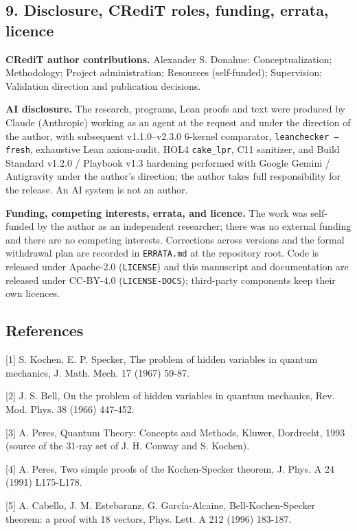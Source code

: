 \documentclass[11pt,a4paper]{article}
\begin{document}
\subsection{9. Disclosure, CRediT roles, funding, errata, licence}\label{9-disclosure-funding-licence}

\textbf{CRediT author contributions.} Alexander S. Donahue: Conceptualization; Methodology; Project administration; Resources (self-funded); Supervision; Validation direction and publication decisions.

\textbf{AI disclosure.} The research, programs, Lean proofs and text were produced by Claude (Anthropic) working as an agent at the request and under the direction of the author, with subsequent v1.1.0--v2.3.0 6-kernel comparator, \texttt{leanchecker --fresh}, exhaustive Lean axiom-audit, HOL4 \texttt{cake\_lpr}, C11 sanitizer, and Build Standard v1.2.0 / Playbook v1.3 hardening performed with Google Gemini / Antigravity under the author's direction; the author takes full responsibility for the release. An AI system is not an author.

\textbf{Funding, competing interests, errata, and licence.} The work was self-funded by the author as an independent researcher; there was no external funding and there are no competing interests. Corrections across versions and the formal withdrawal plan are recorded in \texttt{ERRATA.md} at the repository root. Code is released under Apache-2.0 (\texttt{LICENSE}) and this manuscript and documentation are released under CC-BY-4.0 (\texttt{LICENSE-DOCS}); third-party components keep their own licences.

\subsection{References}\label{references}

{[}1{]} S. Kochen, E. P. Specker, The problem of hidden variables in quantum mechanics, J. Math. Mech. 17 (1967) 59-87.

{[}2{]} J. S. Bell, On the problem of hidden variables in quantum mechanics, Rev. Mod. Phys. 38 (1966) 447-452.

{[}3{]} A. Peres, Quantum Theory: Concepts and Methods, Kluwer, Dordrecht, 1993 (source of the 31-ray set of J. H. Conway and S. Kochen).

{[}4{]} A. Peres, Two simple proofs of the Kochen-Specker theorem, J. Phys. A 24 (1991) L175-L178.

{[}5{]} A. Cabello, J. M. Estebaranz, G. García-Alcaine, Bell-Kochen-Specker theorem: a proof with 18 vectors, Phys. Lett. A 212 (1996) 183-187.
\end{document}
